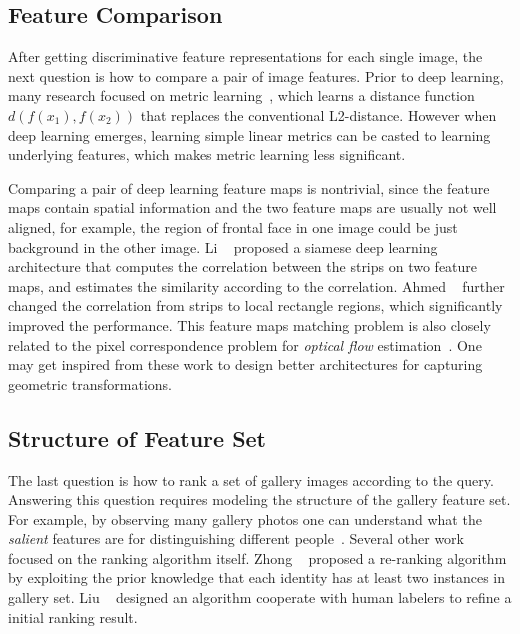 \subsection{Feature Comparison} %
\label{sub:human-id-feat-comp}
After getting discriminative feature representations for each single image, the next question is how to compare a pair of image features. Prior to deep learning, many research focused on metric learning~\cite{davis2007information,weinberger2005distance,mcfee2010metric,koestinger2012large,liao2015person,zhang2016learning}, which learns a distance function $d(f(x_1), f(x_2))$ that replaces the conventional L2-distance. However when deep learning emerges, learning simple linear metrics can be casted to learning underlying features, which makes metric learning less significant.

Comparing a pair of deep learning feature maps is nontrivial, since the feature maps contain spatial information and the two feature maps are usually not well aligned, for example, the region of frontal face in one image could be just background in the other image. Li \etal~\cite{li2014deepreid} proposed a siamese deep learning architecture that computes the correlation between the strips on two feature maps, and estimates the similarity according to the correlation. Ahmed \etal~\cite{ahmed2015improved} further changed the correlation from strips to local rectangle regions, which significantly improved the performance. This feature maps matching problem is also closely related to the pixel correspondence problem for \emph{optical flow} estimation~\cite{weinzaepfel2013deepflow,revaud2016deepmatching}. One may get inspired from these work to design better architectures for capturing geometric transformations.

\subsection{Structure of Feature Set} %
\label{sub:human-id-structure-set}
The last question is how to rank a set of gallery images according to the query. Answering this question requires modeling the structure of the gallery feature set. For example, by observing many gallery photos one can understand what the \emph{salient} features are for distinguishing different people~\cite{zhao2013unsupervised,zhao2017person}. Several other work focused on the ranking algorithm itself. Zhong \etal~\cite{zhong2017re} proposed a re-ranking algorithm by exploiting the prior knowledge that each identity has at least two instances in gallery set. Liu \etal~\cite{liu2013pop} designed an algorithm cooperate with human labelers to refine a initial ranking result.
